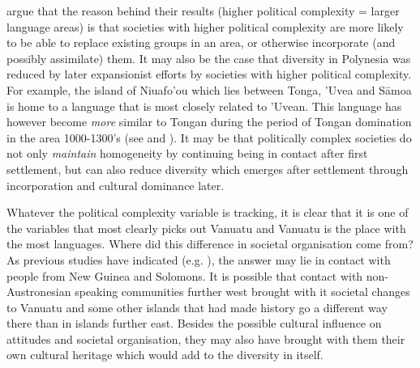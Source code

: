 \documentclass[12pt,letterpaper]{article}
\begin{document}
\citet{curriemace2009} argue that the reason behind their results (higher political complexity = larger language areas) is that societies with higher political complexity are more likely to be able to replace existing groups in an area, or otherwise incorporate (and possibly assimilate) them. It may also be the case that diversity in Polynesia was reduced by later expansionist efforts by societies with higher political complexity. For example, the island of Niuafo'ou which lies between Tonga, 'Uvea and S\={a}moa is home to a language that is most closely related to 'Uvean. This language has however become \emph{more} similar to Tongan during the period of Tongan domination in the area 1000-1300's (see \citet{aswani1998tongan} and \citep[2-9]{tuskamoto_niuafoou}). It may be that politically complex societies do not only \emph{maintain} homogeneity by continuing being in contact after first settlement, but can also reduce diversity which emerges after settlement through incorporation and cultural dominance later.

Whatever the political complexity variable is tracking, it is clear that it is one of the variables that most clearly picks out Vanuatu and Vanuatu is the place with the most languages. Where did this difference in societal organisation come from? As previous studies have indicated (e.g. \citet{lynch1981melanesian}), the answer may lie in contact with people from New Guinea and Solomons. It is possible that contact with non-Austronesian speaking communities further west brought with it societal changes to Vanuatu and some other islands that had made history go a different way there than in islands further east. Besides the possible cultural influence on attitudes and societal organisation, they may also have brought with them their own cultural heritage which would add to the diversity in itself.


\end{document}
